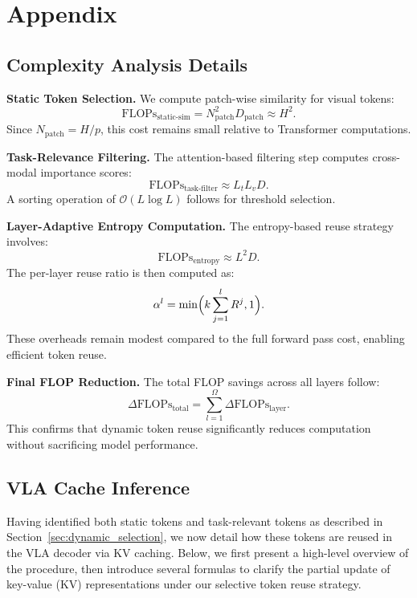 \section{Appendix}


\subsection{Complexity Analysis Details}
\label{appendix:complexity}

\noindent
\textbf{Static Token Selection.} 
We compute patch-wise similarity for visual tokens:
\begin{equation}
\label{eq:patch_sim_flops}
\text{FLOPs}_{\text{static-sim}} = N_{\mathrm{patch}}^2 D_{\mathrm{patch}} \approx H^2.
\end{equation}
Since $N_{\mathrm{patch}} = H/p$, this cost remains small relative to Transformer computations.

\noindent
\textbf{Task-Relevance Filtering.} 
The attention-based filtering step computes cross-modal importance scores:
\begin{equation}
\label{eq:task_relevance_flops}
\text{FLOPs}_{\text{task-filter}} \approx L_t L_v D.
\end{equation}
A sorting operation of $\mathcal{O}(L \log L)$ follows for threshold selection.

\noindent
\textbf{Layer-Adaptive Entropy Computation.} 
The entropy-based reuse strategy involves:
\begin{equation}
\label{eq:entropy_cost}
\text{FLOPs}_{\text{entropy}} \approx L^2 D.
\end{equation}
The per-layer reuse ratio is then computed as:
\begin{equation}
\label{eq:reuse_ratio_append}
\alpha^l = \min\Bigl( k \sum_{j=1}^l R^j, 1 \Bigr).
\end{equation}
These overheads remain modest compared to the full forward pass cost, enabling efficient token reuse.

\noindent
\textbf{Final FLOP Reduction.} 
The total FLOP savings across all layers follow:
\begin{equation}
\label{eq:total_flop_savings}
\Delta \text{FLOPs}_{\text{total}} = \sum_{l=1}^{\Omega} \Delta \text{FLOPs}_{\text{layer}}.
\end{equation}
This confirms that dynamic token reuse significantly reduces computation without sacrificing model performance.

\subsection{VLA Cache Inference}
\label{app:inference_detail}
Having identified both static tokens and task-relevant tokens as described in Section~\ref{sec:dynamic_selection}, we now detail how these tokens are reused in the VLA decoder via KV caching. Below, we first present a high-level overview of the procedure, then introduce several formulas to clarify the partial update of key-value (KV) representations under our selective token reuse strategy.

